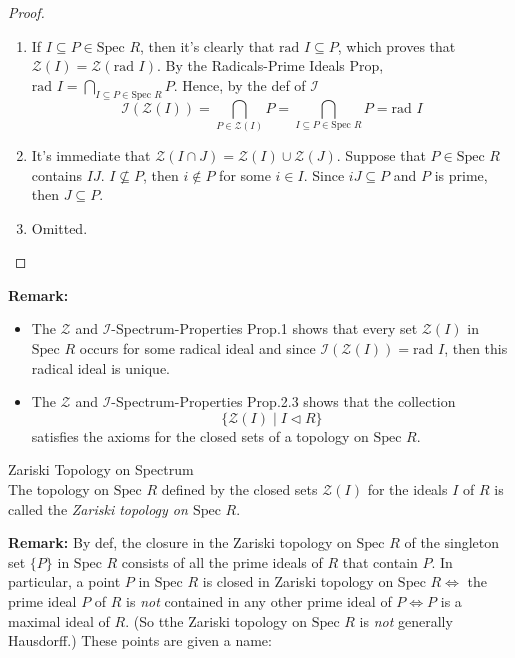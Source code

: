 \begin{proof}
    \begin{enumerate}
        \item If $I \subseteq P\in \text{Spec }R$, then it's clearly that $\text{rad }I \subseteq P$, which proves that $\mathcal{Z} (I)= \mathcal{Z} (\text{rad }I)$. By the Radicals-Prime Ideals Prop, $\text{rad }I= \bigcap_{I \subseteq P \in \text{Spec }R} P$. Hence, by the def of $\mathcal{I}$
        $$\mathcal{I} (\mathcal{Z} (I)) =\bigcap_{P \in \mathcal{Z} (I)}P = \bigcap_{I \subseteq P \in \text{Spec }R} P=\text{rad }I$$

        \item It's immediate that $\mathcal{Z} (I \cap J)= \mathcal{Z} (I) \cup \mathcal{Z} (J)$. Suppose that $P \in \text{Spec }R$ contains $IJ$. $I \not \subseteq P$, then $i \notin P$ for some $i \in I$. Since $iJ \subseteq P$ and $P$ is prime, then $J \subseteq P$.
        \item Omitted.
    \end{enumerate}
\end{proof}

\noindent\textbf{Remark:} \begin{itemize}
    \item The $\mathcal{Z}$ and $\mathcal{I}$-Spectrum-Properties Prop.1 shows that every set $\mathcal{Z} (I)$ in $\text{Spec }R$ occurs for some radical ideal and since $\mathcal{I} (\mathcal{Z} (I)) = \text{rad }I$, then this radical ideal is unique.

    \item The $\mathcal{Z}$ and $\mathcal{I}$-Spectrum-Properties Prop.2.3 shows that the collection
    $$\{\mathcal{Z} (I) \mid I\triangleleft R\}$$
    satisfies the axioms for the closed sets of a topology on $\text{Spec }R$.
\end{itemize}

\begin{definition}{Zariski Topology on Spectrum}\\
The topology on $\text{Spec }R$ defined by the closed sets $\mathcal{Z} (I)$ for the ideals $I$ of $R$ is called the \textit{Zariski topology on $\text{Spec }R$}.
\end{definition}

\noindent\textbf{Remark:} By def, the closure in the Zariski topology on $\text{Spec }R$ of the singleton set $\{P\}$ in $\text{Spec }R$ consists of all the prime ideals of $R$ that contain $P$. In particular, a point $P$ in $\text{Spec }R$ is closed in Zariski topology on $\text{Spec }R \Leftrightarrow$ the prime ideal $P$ of $R$ is \textit{not} contained in any other prime ideal of $P \Leftrightarrow P$ is a maximal ideal of $R$. (So tthe Zariski topology on $\text{Spec }R$ is \textit{not} generally Hausdorff.) These points are given a name:

